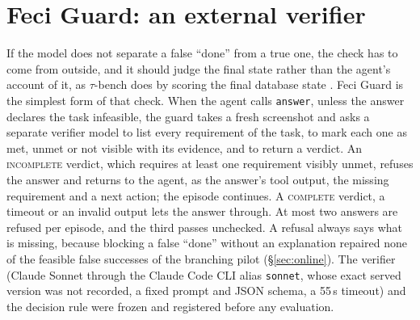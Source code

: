\section{Feci Guard: an external verifier}
\label{sec:guard}
If the model does not separate a false ``done'' from a true one, the check has to come from outside, and it should judge the final state rather than the agent's account of it, as $\tau$-bench does by scoring the final database state \citep{yao2024taubench}. Feci Guard is the simplest form of that check. When the agent calls \texttt{answer}, unless the answer declares the task infeasible, the guard takes a fresh screenshot and asks a separate verifier model to list every requirement of the task, to mark each one as met, unmet or not visible with its evidence, and to return a verdict. An \textsc{incomplete} verdict, which requires at least one requirement visibly unmet, refuses the answer and returns to the agent, as the answer's tool output, the missing requirement and a next action; the episode continues. A \textsc{complete} verdict, a timeout or an invalid output lets the answer through. At most two answers are refused per episode, and the third passes unchecked. A refusal always says what is missing, because blocking a false ``done'' without an explanation repaired none of the feasible false successes of the branching pilot (\S\ref{sec:online}). The verifier (Claude Sonnet through the Claude Code CLI alias \texttt{sonnet}, whose exact served version was not recorded, a fixed prompt and JSON schema, a 55\,s timeout) and the decision rule were frozen and registered before any evaluation. %


